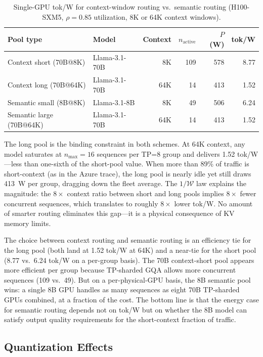 \documentclass[11pt,a4paper]{article}
\newcommand{\nmax}{n_{\max}}
\newcommand{\nact}{n_{\text{active}}}
\begin{document}
\begin{table}[htbp]
\centering
\caption{Single-GPU tok/W for context-window routing vs.\ semantic routing
  (H100-SXM5, $\rho = 0.85$ utilization, 8K or 64K context windows).}
\label{tab:routing-compare}
\small
\begin{tabular}{llrrrr}
\toprule
Pool type & Model & Context & $\nact$ & $P$ (W) & tok/W \\
\midrule
Context short (70B@8K)  & Llama-3.1-70B & 8K  & 109 & 578 & 8.77 \\
Context long  (70B@64K) & Llama-3.1-70B & 64K &  14 & 413 & 1.52 \\
\midrule
Semantic small (8B@8K)  & Llama-3.1-8B  & 8K  &  49 & 506 & 6.24 \\
Semantic large (70B@64K)& Llama-3.1-70B & 64K &  14 & 413 & 1.52 \\
\bottomrule
\end{tabular}
\end{table}

The long pool is the binding constraint in both schemes.  At 64K context, any
model saturates at $\nmax = 16$ sequences per TP=8 group and delivers
1.52 tok/W---less than one-sixth of the short-pool value.  When more than
89\% of traffic is short-context (as in the Azure trace), the long pool is
nearly idle yet still draws 413~W per group, dragging down the fleet average.
The $1/\mathcal{W}$ law explains the magnitude: the $8\times$ context ratio
between short and long pools implies $8\times$ fewer concurrent sequences,
which translates to roughly $8\times$ lower tok/W.  No amount of smarter
routing eliminates this gap---it is a physical consequence of KV memory limits.

The choice between context routing and semantic routing is an efficiency tie
for the long pool (both land at 1.52 tok/W at 64K) and a near-tie for the
short pool (8.77 vs.\ 6.24 tok/W on a per-group basis).  The 70B
context-short pool appears more efficient per group because TP-sharded GQA
allows more concurrent sequences (109 vs.\ 49).  But on a per-physical-GPU
basis, the 8B semantic pool wins: a single 8B GPU handles as many sequences
as eight 70B TP-sharded GPUs combined, at a fraction of the cost.  The
bottom line is that the energy case for semantic routing depends not on tok/W
but on whether the 8B model can satisfy output quality requirements for the
short-context fraction of traffic.

\subsection{Quantization Effects}
\label{sec:quant}
\end{document}
